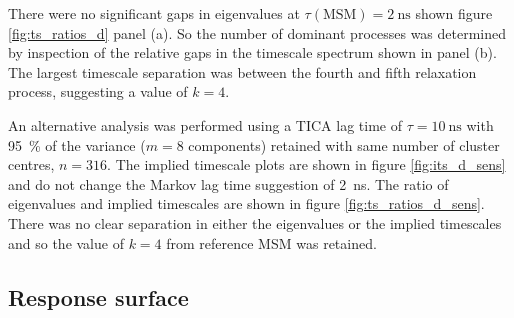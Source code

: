 There were no significant gaps in eigenvalues at $\tau(\mathrm{MSM})=\SI{2}{\nano\second}$  shown figure \ref{fig:ts_ratios_d} panel (a). So the number of dominant processes was determined by inspection of the relative gaps in the timescale spectrum shown in  panel (b). The largest timescale separation was between the fourth and fifth relaxation process, suggesting a value of $k=4$. 

An alternative analysis was performed using a TICA lag time of $\tau=\SI{10}{\nano\second}$ with \SI{95}{\percent} of the variance ($m=8$ components) retained with same number of cluster centres, $n=316$. The implied timescale plots are shown in figure \ref{fig:its_d_sens} and  do not change the Markov lag time suggestion of \SI{2}{\nano\second}. The ratio of eigenvalues and implied timescales  are shown in figure \ref{fig:ts_ratios_d_sens}. There was no clear separation in either the eigenvalues or the implied timescales and so the value of $k=4$ from reference MSM was retained.

\subsection{Response surface}\label{sec:aadh_rsm}

